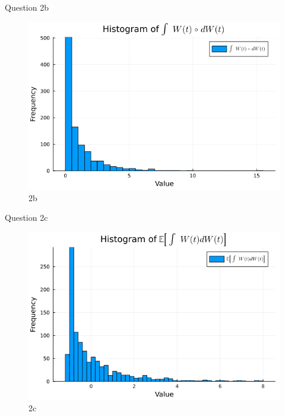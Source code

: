 \documentclass[compress,12pt]{beamer}
\begin{document}
\begin{frame}{Question 2b}

      \begin{figure}[H]
            \centering
            \includegraphics[scale=0.5]{imgs/2b.png}
            \caption{2b}
            \label{fig:2b}
      \end{figure}
\end{frame}

\begin{frame}{Question 2c}

      \begin{figure}[H]
            \centering
            \includegraphics[scale=0.5]{imgs/2c.png}
            \caption{2c}
            \label{fig:2c}
      \end{figure}
\end{frame}
\end{document}
